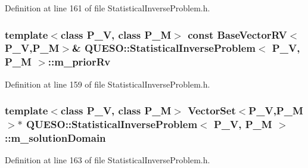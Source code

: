 Definition at line 161 of file Statistical\-Inverse\-Problem.\-h.

\hypertarget{class_q_u_e_s_o_1_1_statistical_inverse_problem_aebe8ce8eb6fa5f264cafffbe35fbead0}{
\subsubsection[{m\-\_\-prior\-Rv}]{\setlength{\rightskip}{0pt plus 5cm}template$<$class P\-\_\-\-V, class P\-\_\-\-M$>$ const {\bf Base\-Vector\-R\-V}$<$P\-\_\-\-V,P\-\_\-\-M$>$\& {\bf Q\-U\-E\-S\-O\-::\-Statistical\-Inverse\-Problem}$<$ P\-\_\-\-V, P\-\_\-\-M $>$\-::m\-\_\-prior\-Rv\hspace{0.3cm}{\ttfamily [private]}}}\label{class_q_u_e_s_o_1_1_statistical_inverse_problem_aebe8ce8eb6fa5f264cafffbe35fbead0}


Definition at line 159 of file Statistical\-Inverse\-Problem.\-h.

\hypertarget{class_q_u_e_s_o_1_1_statistical_inverse_problem_a51eeabd608af36b009d67b2a5244db9c}{
\subsubsection[{m\-\_\-solution\-Domain}]{\setlength{\rightskip}{0pt plus 5cm}template$<$class P\-\_\-\-V, class P\-\_\-\-M$>$ {\bf Vector\-Set}$<$P\-\_\-\-V,P\-\_\-\-M$>$$\ast$ {\bf Q\-U\-E\-S\-O\-::\-Statistical\-Inverse\-Problem}$<$ P\-\_\-\-V, P\-\_\-\-M $>$\-::m\-\_\-solution\-Domain\hspace{0.3cm}{\ttfamily [private]}}}\label{class_q_u_e_s_o_1_1_statistical_inverse_problem_a51eeabd608af36b009d67b2a5244db9c}


Definition at line 163 of file Statistical\-Inverse\-Problem.\-h.

